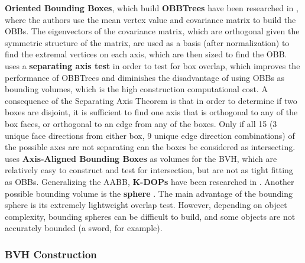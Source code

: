 
\textbf{Oriented Bounding Boxes}, which build \textbf{OBBTrees} have been researched in \citep{gott96}, where the authors use the mean vertex value and covariance matrix to build the OBBs. The eigenvectors of the covariance matrix, which are orthogonal given the symmetric structure of the matrix, are used as a basis (after normalization) to find the extremal vertices on each axis, which are then sized to find the OBB.
\citep{gott96} uses a \textbf{separating axis test} in order to test for box overlap, which improves the performance of OBBTrees and diminishes the disadvantage of using OBBs as bounding volumes, which is the high construction computational cost. A consequence of the Separating Axis Theorem is that in order to determine if two boxes are disjoint, it is sufficient to find one axis that is orthogonal to any of the box faces, or orthogonal to an edge from any of the boxes. Only if all 15 (3 unique face directions from either box, 9 unique edge direction combinations) of the possible axes are not separating can the boxes be considered as intersecting. \citep{vdb97} uses \textbf{Axis-Aligned Bounding Boxes} as volumes for the BVH, which are relatively easy to construct and test for intersection, but are not as tight fitting as OBBs. Generalizing the AABB, \textbf{K-DOPs} have been researched in \citep{klo98}. Another possible bounding volume is the \textbf{sphere} \citep{hub96, rtsd01}. The main advantage of the bounding sphere is its extremely lightweight overlap test. However, depending on object complexity, bounding spheres can be difficult to build, and some objects are not accurately bounded (a sword, for example).

\subsubsection{BVH Construction}
\label{sub-sub-sec:bvhconstruction}

